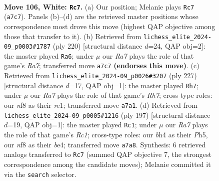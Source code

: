 \documentclass[11pt]{article}
\begin{document}
\clearpage

\begin{figure}[p]\centering
\begin{subfigure}{0.46\textwidth}\centering
\resizebox{\linewidth}{!}{%
\newchessgame
\chessboard[
  setfen={5n2/R7/6rp/4p3/6kb/1K1p4/8/8 w - - 8 106},
  showmover=false,
  pgfstyle=straightmove, color=movearrow, markmove={a7-c7}
]}
\caption{}
\end{subfigure}\hfill
\begin{subfigure}{0.46\textwidth}\centering
\resizebox{\linewidth}{!}{%
\newchessgame
\chessboard[
  setfen={8/R7/8/5pr1/8/5pk1/8/5K2 w - - 78 111},
  showmover=false,
  pgfstyle=straightmove, color=movearrow, markmove={a7-a6}
]}
\caption{}
\end{subfigure}
\\[4pt]
\begin{subfigure}{0.46\textwidth}\centering
\resizebox{\linewidth}{!}{%
\newchessgame
\chessboard[
  setfen={8/1RK1P3/8/5P2/8/6k1/7r/4R3 b - - 0 114},
  showmover=false,
  pgfstyle=straightmove, color=movearrow, markmove={h2-h7}
]}
\caption{}
\end{subfigure}\hfill
\begin{subfigure}{0.46\textwidth}\centering
\resizebox{\linewidth}{!}{%
\newchessgame
\chessboard[
  setfen={2r5/4k3/1R4P1/4K2p/4B2P/8/8/8 b - - 2 99},
  showmover=false,
  pgfstyle=straightmove, color=movearrow, markmove={c8-c1}
]}
\caption{}
\end{subfigure}
\caption{\textbf{Move 106, White: \texttt{Rc7}.} (a) Our position; Melanie plays \texttt{Rc7} (\texttt{a7c7}). Panels (b)--(d) are the retrieved master positions whose correspondence most drove this move (highest QAP objective among those that transfer to it). (b) Retrieved from \texttt{lichess\_elite\_2024-09\_p0003\#1787} (ply 220) [structural distance $d$=24, QAP obj=2]: the master played \texttt{Ra6}; under $\mu$ our \emph{Ra7} plays the role of that game's \emph{Ra7}; transferred move \texttt{a7c7} \textbf{(endorses this move)}. (c) Retrieved from \texttt{lichess\_elite\_2024-09\_p0026\#3207} (ply 227) [structural distance $d$=17, QAP obj=1]: the master played \texttt{Rh7}; under $\mu$ our \emph{Ra7} plays the role of that game's \emph{Rh7}; cross-type roles: our \emph{n}f8 as their \emph{r}e1; transferred move \texttt{a7a1}. (d) Retrieved from \texttt{lichess\_elite\_2024-09\_p0005\#1216} (ply 197) [structural distance $d$=19, QAP obj=1]: the master played \texttt{Rc1}; under $\mu$ our \emph{Ra7} plays the role of that game's \emph{Rc1}; cross-type roles: our \emph{b}h4 as their \emph{P}h5, our \emph{n}f8 as their \emph{b}e4; transferred move \texttt{a7a8}. Synthesis: 6 retrieved analogs transferred to \texttt{Rc7} (summed QAP objective 7, the strongest correspondence among the candidate moves); Melanie committed it via the \texttt{search} selector.}
\label{fig:thought-m210}
\end{figure}
\end{document}
